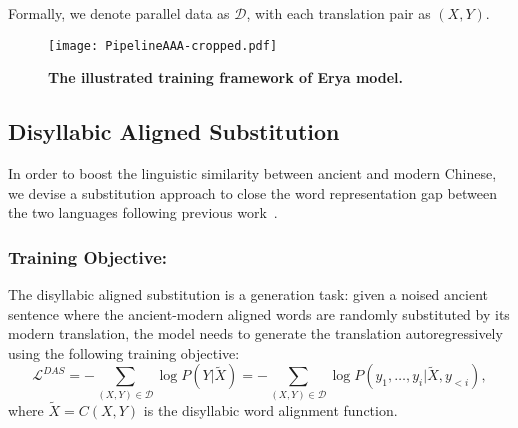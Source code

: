 Formally, we denote parallel data as $\mathcal{D}$, with each translation pair as $(X, Y)$.

 
\begin{figure}[htbp]
  \centering
  \texttt{[image: PipelineAAA-cropped.pdf]}
  \caption{\textbf{The illustrated training framework of Erya model.}}
  \label{fig:example}
\end{figure}


\subsection{Disyllabic Aligned Substitution}
In order to boost the linguistic similarity between ancient and modern Chinese, we devise a substitution approach to close the word representation gap between the two languages following previous work~\cite{DBLP:conf/emnlp/LinPWQFZL20}.



\subsubsection{Training Objective:}
The disyllabic aligned substitution is a generation task: given a noised ancient sentence where the ancient-modern aligned words are randomly substituted by its modern translation, the model needs to generate the translation autoregressively using the following training objective:
\begin{equation}\label{eq:DAS}
    \mathcal{L}^{DAS} = - \sum_{(X, Y)\in \mathcal{D}} \log P (Y|\tilde{X}) = - \sum_{(X, Y)\in \mathcal{D}} \log P (y_1, \dots, y_i |\tilde{X}, y_{<i}),
\end{equation}
where $\tilde{X}=C(X, Y)$ is the disyllabic word alignment function.



